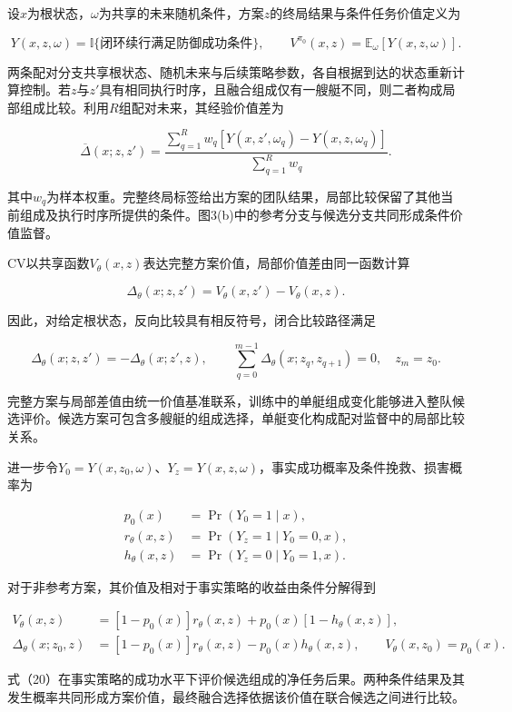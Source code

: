 \documentclass[
  11pt,
  fontset=none]{ctexart}
\begin{document}
设\(x\)为根状态，\(\omega\)为共享的未来随机条件，方案\(z\)的终局结果与条件任务价值定义为

\[
Y(x,z,\omega)=\mathbb I\{\text{闭环续行满足防御成功条件}\},
\qquad
V^{\pi_0}(x,z)=\mathbb E_\omega[Y(x,z,\omega)] .
\tag{15}
\]

两条配对分支共享根状态、随机未来与后续策略参数，各自根据到达的状态重新计算控制。若\(z\)与\(z'\)具有相同执行时序，且融合组成仅有一艘艇不同，则二者构成局部组成比较。利用\(R\)组配对未来，其经验价值差为

\[
\overline\Delta(x;z,z')
=\frac{\sum_{q=1}^{R}w_q
\left[Y(x,z',\omega_q)-Y(x,z,\omega_q)\right]}
{\sum_{q=1}^{R}w_q} .
\tag{16}
\]

其中\(w_q\)为样本权重。完整终局标签给出方案的团队结果，局部比较保留了其他当前组成及执行时序所提供的条件。图3(b)中的参考分支与候选分支共同形成条件价值监督。

CV以共享函数\(V_\theta(x,z)\)表达完整方案价值，局部价值差由同一函数计算

\[
\Delta_\theta(x;z,z')
=V_\theta(x,z')-V_\theta(x,z) .
\tag{17}
\]

因此，对给定根状态，反向比较具有相反符号，闭合比较路径满足

\[
\Delta_\theta(x;z,z')=-\Delta_\theta(x;z',z),
\qquad
\sum_{q=0}^{m-1}\Delta_\theta(x;z_q,z_{q+1})=0,
\quad z_m=z_0 .
\tag{18}
\]

完整方案与局部差值由统一价值基准联系，训练中的单艇组成变化能够进入整队候选评价。候选方案可包含多艘艇的组成选择，单艇变化构成配对监督中的局部比较关系。

进一步令\(Y_0=Y(x,z_0,\omega)\)、\(Y_z=Y(x,z,\omega)\)，事实成功概率及条件挽救、损害概率为

\[
\begin{aligned}
p_0(x)&=\Pr(Y_0=1\mid x),\\
r_\theta(x,z)&=\Pr(Y_z=1\mid Y_0=0,x),\\
h_\theta(x,z)&=\Pr(Y_z=0\mid Y_0=1,x).
\end{aligned}
\tag{19}
\]

对于非参考方案，其价值及相对于事实策略的收益由条件分解得到

\[
\begin{aligned}
V_\theta(x,z)
&=[1-p_0(x)]r_\theta(x,z)
+p_0(x)[1-h_\theta(x,z)],\\
\Delta_\theta(x;z_0,z)
&=[1-p_0(x)]r_\theta(x,z)-p_0(x)h_\theta(x,z),
\qquad V_\theta(x,z_0)=p_0(x).
\end{aligned}
\tag{20}
\]

式（20）在事实策略的成功水平下评价候选组成的净任务后果。两种条件结果及其发生概率共同形成方案价值，最终融合选择依据该价值在联合候选之间进行比较。
\end{document}
